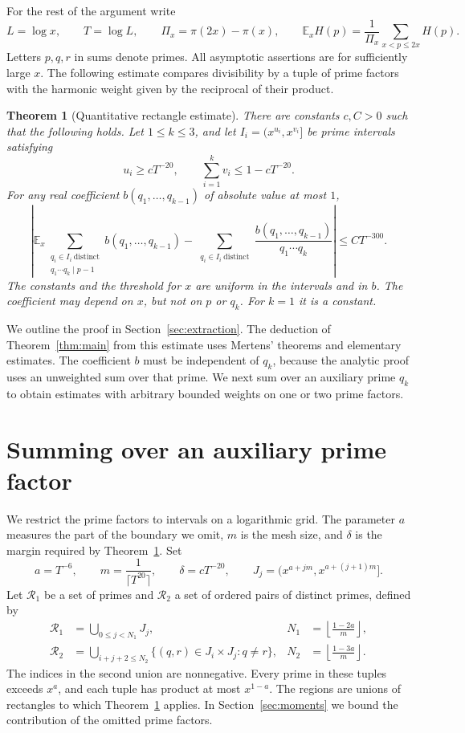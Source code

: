 \documentclass[10pt]{article}
\newtheorem{thm}{Theorem}[section]
\newcommand{\EE}{\mathbb E}
\newcommand{\calR}{\mathcal R}
\begin{document}
For the rest of the argument write
\[
 L=\log x,\qquad T=\log L,\qquad
 \Pi_x=\pi(2x)-\pi(x),\qquad
 \EE_x H(p)=\frac1{\Pi_x}\sum_{x<p\leq2x}H(p).
\]
Letters $p,q,r$ in sums denote primes. All asymptotic assertions are for sufficiently large $x$. The following estimate compares divisibility by a tuple of prime factors with the harmonic weight given by the reciprocal of their product.

\begin{thm}[Quantitative rectangle estimate]\label{thm:rectangle}
There are constants $c,C>0$ such that the following holds. Let $1\leq k\leq3$, and let $I_i=(x^{u_i},x^{v_i}]$ be prime intervals satisfying
\[
 u_i\geq cT^{-20},\qquad \sum_{i=1}^k v_i\leq1-cT^{-20}.
\]
For any real coefficient $b(q_1,\ldots,q_{k-1})$ of absolute value at most $1$,
\begin{equation}\label{eq:R}
 \left|\EE_x\sum_{\substack{q_i\in I_i\ \mathrm{distinct}\\
                         q_1\cdots q_k\mid p-1}}
 b(q_1,\ldots,q_{k-1})
 -\sum_{\substack{q_i\in I_i\ \mathrm{distinct}}}
 \frac{b(q_1,\ldots,q_{k-1})}{q_1\cdots q_k}\right|
 \leq CT^{-300}.
\end{equation}
The constants and the threshold for $x$ are uniform in the intervals and in $b$. The coefficient may depend on $x$, but not on $p$ or $q_k$. For $k=1$ it is a constant.
\end{thm}

We outline the proof in Section~\ref{sec:extraction}. The deduction of Theorem~\ref{thm:main} from this estimate uses Mertens' theorems and elementary estimates. The coefficient $b$ must be independent of $q_k$, because the analytic proof uses an unweighted sum over that prime. We next sum over an auxiliary prime $q_k$ to obtain estimates with arbitrary bounded weights on one or two prime factors.

\section{Summing over an auxiliary prime factor}\label{sec:spare}

We restrict the prime factors to intervals on a logarithmic grid. The parameter $a$ measures the part of the boundary we omit, $m$ is the mesh size, and $\delta$ is the margin required by Theorem~\ref{thm:rectangle}. Set
\[
 a=T^{-6},\qquad m=\frac1{\lceil T^{20}\rceil},\qquad
 \delta=cT^{-20},\qquad
 J_j=(x^{a+jm},x^{a+(j+1)m}].
\]
Let $\calR_1$ be a set of primes and $\calR_2$ a set of ordered pairs of distinct primes, defined by
\begin{align*}
 \calR_1&=\bigcup_{0\leq j<N_1}J_j,
 &N_1&=\left\lfloor\frac{1-2a}{m}\right\rfloor,\\
 \calR_2&=\bigcup_{i+j+2\leq N_2}
       \{(q,r)\in J_i\times J_j:q\ne r\},
 &N_2&=\left\lfloor\frac{1-3a}{m}\right\rfloor.
\end{align*}
The indices in the second union are nonnegative. Every prime in these tuples exceeds $x^a$, and each tuple has product at most $x^{1-a}$. The regions are unions of rectangles to which Theorem~\ref{thm:rectangle} applies. In Section~\ref{sec:moments} we bound the contribution of the omitted prime factors.
\end{document}
